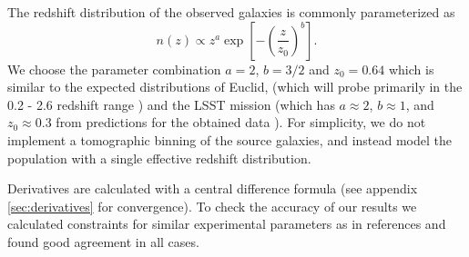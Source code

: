 \documentclass[11pt]{article} %
\newcommand{\br}[1]{\ensuremath{\left( #1 \right)}}
\newcommand{\sbr}[1]{\ensuremath{\left[ #1 \right]}}
\begin{document}

The redshift distribution of the observed galaxies is commonly parameterized as \cite{bartelmann2001weak}
\begin{equation*}
    n(z) \propto z^a \exp\sbr{-\br{\frac{z}{z_0}}^b}.
\end{equation*}
We choose the parameter combination $a = 2$, $b = 3/2$ and $z_0 = 0.64$ which is similar to the expected distributions of Euclid, (which will probe primarily in the 0.2 - 2.6 redshift range \cite{euclidprep10})
and the LSST mission (which has $a \approx 2$, $b \approx 1$, and $z_0 \approx 0.3$ from predictions for the obtained data \cite{lsstsciencebookchapter3}). For simplicity, we do not implement a tomographic binning of the source galaxies, and instead model the population with a single effective redshift distribution.

Derivatives are calculated with a central difference formula (see appendix \ref{sec:derivatives} for convergence).  To check the accuracy of our results we calculated constraints for similar experimental parameters as in references \cite{Planck2018Lensing, Takada2003, cmbs4sciencebook,neutrinoconstraints} and found good agreement in all cases.
\end{document}
